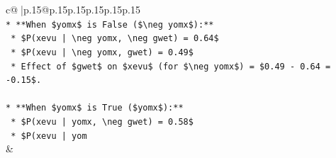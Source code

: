 \documentclass{article}
\begin{document}
{\begin{supertabular}{c@{$\;$}|p{.15\linewidth}@{}p{.15\linewidth}p{.15\linewidth}p{.15\linewidth}p{.15\linewidth}p{.15\linewidth}}
{{{\\ 
\texttt{*   **When \$yomx\$ is False (\$\textbackslash{}neg yomx\$):**} \\
\texttt{    *   \$P(xevu | \textbackslash{}neg yomx, \textbackslash{}neg gwet) = 0.64\$} \\
\texttt{    *   \$P(xevu | \textbackslash{}neg yomx, gwet) = 0.49\$} \\
\texttt{    *   Effect of \$gwet\$ on \$xevu\$ (for \$\textbackslash{}neg yomx\$) = \$0.49 {-} 0.64 = {-}0.15\$.} \\
\\ 
\texttt{*   **When \$yomx\$ is True (\$yomx\$):**} \\
\texttt{    *   \$P(xevu | yomx, \textbackslash{}neg gwet) = 0.58\$} \\
\texttt{    *   \$P(xevu | yom} \\
            }
        }
    }
    & \\ \\


\end{supertabular}}
\end{document}
